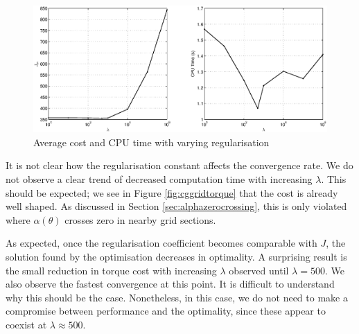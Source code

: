 \begin{figure}
\centering
\includegraphics[width=\linewidth]{7Results/reg}
\caption{Average cost and CPU time with varying regularisation}
\label{fig:reg}
\end{figure}

It is not clear how the regularisation constant affects the convergence rate. We do not observe a clear trend of decreased computation time with increasing $\lambda$. This should be expected; we see in Figure \ref{fig:cggridtorque} that the cost is already well shaped. As discussed in Section \ref{sec:alphazerocrossing}, this is only violated where $\alpha(\theta)$ crosses zero in nearby grid sections.

As expected, once the regularisation coefficient becomes comparable with $J$, the solution found by the optimisation decreases in optimality. A surprising result is the small reduction in torque cost with increasing $\lambda$ observed until $\lambda=500$. We also observe the fastest convergence at this point. It is difficult to understand why this should be the case. Nonetheless, in this case, we do not need to make a compromise between performance and the optimality, since these appear to coexist at $\lambda\approx500$.